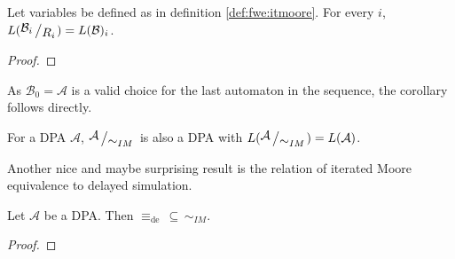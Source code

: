 \begin{lem}
	Let variables be defined as in definition \ref{def:fwe:itmoore}. For every $i$, $L(\bigslant{\mathcal{B}_i}{R_i}) = L(\mathcal{B})_i$.
\end{lem}

\begin{proof}
\end{proof}

As $\mathcal{B}_0 = \mathcal{A}$ is a valid choice for the last automaton in the sequence, the corollary follows directly.

\begin{cor}
	For a DPA $\mathcal{A}$, $\bigslant{\mathcal{A}}{\sim_{IM}}$ is also a DPA with $L(\bigslant{\mathcal{A}}{\sim_{IM}}) = L(\mathcal{A})$.
\end{cor}

\vspace{0.6cm}
Another nice and maybe surprising result is the relation of iterated Moore equivalence to delayed simulation.

\begin{theorem}
	Let $\mathcal{A}$ be a DPA. Then $\equiv_\text{de} \,\subseteq\, \sim_{IM}$.
\end{theorem}

\begin{proof}
\end{proof}














